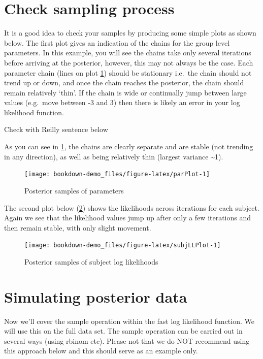 \documentclass[]{book}
\begin{document}
\hypertarget{check-sampling-process}{%
\section{Check sampling process}\label{check-sampling-process}}

It is a good idea to check your samples by producing some simple plots as shown below. The first plot gives an indication of the chains for the group level parameters. In this example, you will see the chains take only several iterations before arriving at the posterior, however, this may not always be the case. Each parameter chain (lines on plot \ref{fig:parPlot}) should be stationary i.e.~the chain should not trend up or down, and once the chain reaches the posterior, the chain should remain relatively `thin'. If the chain is wide or continually jump between large values (e.g.~move between -3 and 3) then there is likely an error in your log likelihood function.

Check with Reilly sentence below

As you can see in \ref{fig:parPlot}, the chains are clearly separate and are stable (not trending in any direction), as well as being relatively thin (largest variance \textasciitilde{}1).

\begin{figure}
\texttt{[image: bookdown-demo\_files/figure-latex/parPlot-1]} \caption{Posterior samples of parameters}\label{fig:parPlot}
\end{figure}

The second plot below (\ref{fig:subjLLPlot}) shows the likelihoods across iterations for each subject. Again we see that the likelihood values jump up after only a few iterations and then remain stable, with only slight movement.

\begin{figure}
\texttt{[image: bookdown-demo\_files/figure-latex/subjLLPlot-1]} \caption{Posterior samples of subject log likelihoods}\label{fig:subjLLPlot}
\end{figure}

\hypertarget{simulating-posterior-data}{%
\section{Simulating posterior data}\label{simulating-posterior-data}}

Now we'll cover the sample operation within the fast log likelihood function. We will use this on the full data set. The sample operation can be carried out in several ways (using rbinom etc). Please not that we do NOT recommend using this approach below and this should serve as an example only.
\end{document}

